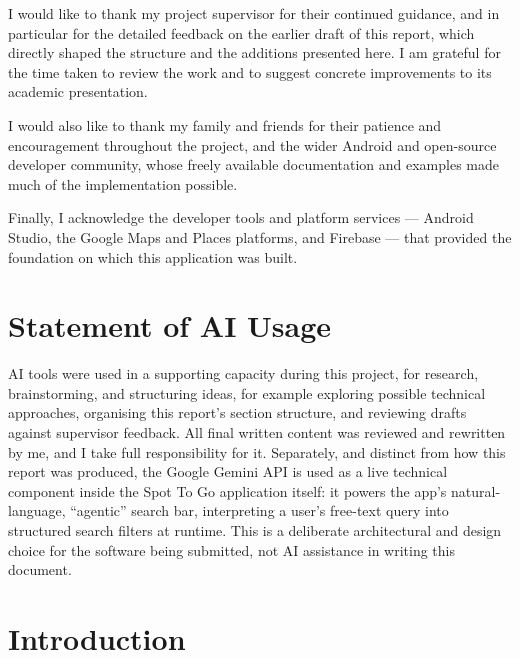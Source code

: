 \documentclass[12pt, a4paper]{article}
\begin{document}
I would like to thank my project supervisor for their continued guidance, and in particular for the detailed feedback on the earlier draft of this report, which directly shaped the structure and the additions presented here. I am grateful for the time taken to review the work and to suggest concrete improvements to its academic presentation.

I would also like to thank my family and friends for their patience and encouragement throughout the project, and the wider Android and open-source developer community, whose freely available documentation and examples made much of the implementation possible.

Finally, I acknowledge the developer tools and platform services --- Android Studio, the Google Maps and Places platforms, and Firebase --- that provided the foundation on which this application was built.

\newpage
\section*{Statement of AI Usage}

AI tools were used in a supporting capacity during this project, for research, brainstorming, and structuring ideas, for example exploring possible technical approaches, organising this report's section structure, and reviewing drafts against supervisor feedback. All final written content was reviewed and rewritten by me, and I take full responsibility for it. Separately, and distinct from how this report was produced, the Google Gemini API is used as a live technical component inside the Spot To Go application itself: it powers the app's natural-language, ``agentic'' search bar, interpreting a user's free-text query into structured search filters at runtime. This is a deliberate architectural and design choice for the software being submitted, not AI assistance in writing this document.

\newpage
\tableofcontents
\clearpage


\section{Introduction}
\end{document}
